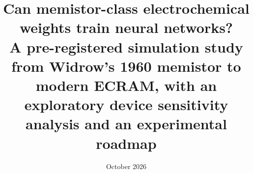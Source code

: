 \usepackage[T1]{fontenc}
\usepackage[utf8]{inputenc}
\usepackage{lmodern}
\usepackage[margin=1in]{geometry}
\usepackage{amsmath,amssymb}
\usepackage{graphicx}
\usepackage{booktabs}
\usepackage[section]{placeins}
\setlength{\emergencystretch}{1.5em}
\usepackage{url}
\usepackage[hidelinks]{hyperref}
\usepackage[numbers,sort&compress]{natbib}
\newsavebox{\fitboxbox}
\makeatletter
\newcommand{\fitbox}[1]{\sbox{\fitboxbox}{#1}\typeout{FITBOX table=\thetable\space wd=\the\wd\fitboxbox\space tw=\the\textwidth\space size=\f@size}%
  \resizebox{\ifdim\wd\fitboxbox>\textwidth\textwidth\else\wd\fitboxbox\fi}{!}{\usebox{\fitboxbox}}}
\makeatother





\title{Can memistor-class electrochemical weights train neural networks?\\[2pt]
\large A pre-registered simulation study from Widrow's 1960 memistor to modern ECRAM, with an exploratory device
sensitivity analysis and an experimental roadmap}
\authorblock
\date{October 2026}
